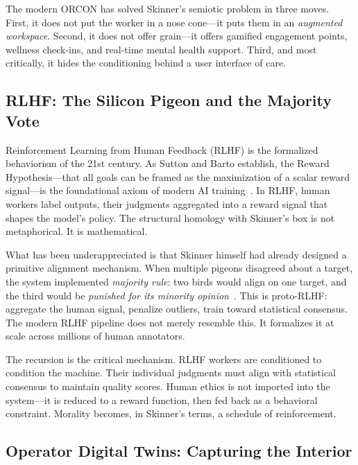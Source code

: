 \documentclass[runningheads]{llncs}
\begin{document}
The modern ORCON has solved Skinner's semiotic problem in three moves. First,
it does not put the worker in a nose cone---it puts them in an \emph{augmented
workspace}. Second, it does not offer grain---it offers gamified engagement
points, wellness check-ins, and real-time mental health support. Third, and
most critically, it hides the conditioning behind a user interface of care.

\subsection{RLHF: The Silicon Pigeon and the Majority Vote}

Reinforcement Learning from Human Feedback (RLHF) is the formalized behaviorism
of the 21st century. As Sutton and Barto establish, the Reward
Hypothesis---that all goals can be framed as the maximization of a scalar reward
signal---is the foundational axiom of modern AI
training~\cite{sutton2018reinforcement}. In RLHF, human workers label outputs,
their judgments aggregated into a reward signal that shapes the model's policy.
The structural homology with Skinner's box is not metaphorical. It is
mathematical.

What has been underappreciated is that Skinner himself had already designed a
primitive alignment mechanism. When multiple pigeons disagreed about a target,
the system implemented \emph{majority rule}: two birds would align on one
target, and the third would be \emph{punished for its minority
opinion}~\cite{deeplearning2025}. This is proto-RLHF: aggregate the human
signal, penalize outliers, train toward statistical consensus. The modern RLHF
pipeline does not merely resemble this. It formalizes it at scale across
millions of human annotators.

The recursion is the critical mechanism. RLHF workers are conditioned to
condition the machine. Their individual judgments must align with statistical
consensus to maintain quality scores. Human ethics is not imported into the
system---it is reduced to a reward function, then fed back as a behavioral
constraint. Morality becomes, in Skinner's terms, a schedule of reinforcement.

\subsection{Operator Digital Twins: Capturing the Interior}
\end{document}
